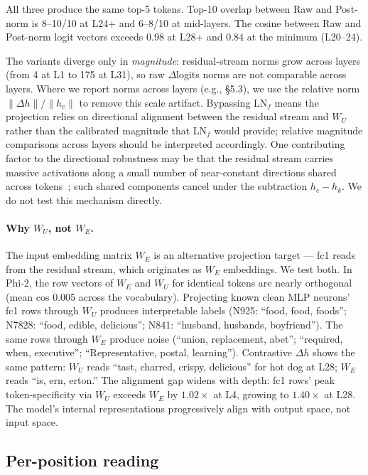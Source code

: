 \documentclass[11pt]{article}
\newcommand{\dhh}{\Delta h}
\newcommand{\WU}{W_U}
\begin{document}
All three produce the same top-5 tokens. Top-10 overlap between Raw and
Post-norm is 8--10/10 at L24+ and 6--8/10 at mid-layers. The cosine between
Raw and Post-norm logit vectors exceeds 0.98 at L28+ and 0.84 at the minimum
(L20--24).

The variants diverge only in \emph{magnitude}: residual-stream norms grow across
layers (from 4 at L1 to 175 at L31), so raw $\Delta$logits norms are not comparable
across layers. Where we report norms across layers (e.g., \S5.3), we use the
relative norm $\|\dhh\| / \|h_c\|$ to remove this scale artifact. Bypassing $\text{LN}_f$
means the projection relies on directional alignment between the residual
stream and $\WU$ rather than the calibrated magnitude that $\text{LN}_f$ would provide;
relative magnitude comparisons across layers should be interpreted
accordingly. One contributing factor to the directional robustness may be that
the residual stream carries massive activations along a small number of
near-constant directions shared across tokens~\citep{sun2026}; such shared
components cancel under the subtraction $h_c - h_k$. We do not test this
mechanism directly.

\paragraph{Why $\WU$, not $W_E$.} The input embedding matrix $W_E$ is an alternative
projection target --- fc1 reads from the residual stream, which originates as
$W_E$ embeddings. We test both. In Phi-2, the row vectors of $W_E$ and $\WU$ for identical
tokens are nearly orthogonal (mean cos 0.005 across the vocabulary). Projecting known clean MLP neurons' fc1
rows through $\WU$ produces interpretable labels (N925: ``food, food, foods'';
N7828: ``food, edible, delicious''; N841: ``husband, husbands, boyfriend'').
The same rows through $W_E$ produce noise (``union, replacement, abet'';
``required, when, executive''; ``Representative, postal, learning'').
Contrastive $\dhh$ shows the same pattern: $\WU$ reads ``tast, charred, crispy,
delicious'' for hot dog at L28; $W_E$ reads ``is, ern, erton.'' The alignment
gap widens with depth: fc1 rows' peak token-specificity via $\WU$ exceeds
$W_E$ by $1.02\times$ at L4, growing to $1.40\times$ at L28. The model's internal
representations progressively align with output space, not input space.

\subsection{Per-position reading}
\end{document}
